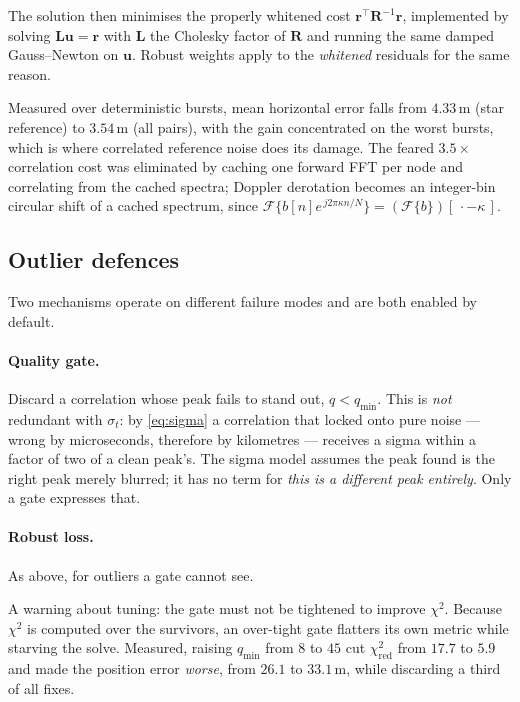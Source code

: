 \documentclass[11pt,a4paper]{article}
\begin{document}
The solution then minimises the properly whitened cost
$\mathbf{r}^\top\mathbf{R}^{-1}\mathbf{r}$, implemented by solving
$\mathbf{L}\mathbf{u}=\mathbf{r}$ with $\mathbf{L}$ the Cholesky factor of
$\mathbf{R}$ and running the same damped Gauss--Newton on $\mathbf{u}$.
Robust weights apply to the \emph{whitened} residuals for the same reason.

Measured over deterministic bursts, mean horizontal error falls from
$4.33$\,m (star reference) to $3.54$\,m (all pairs), with the gain
concentrated on the worst bursts, which is where correlated reference noise
does its damage. The feared $3.5\times$ correlation cost was eliminated by
caching one forward FFT per node and correlating from the cached spectra;
Doppler derotation becomes an integer-bin circular shift of a cached
spectrum, since
$\mathcal{F}\{b[n]e^{\,j2\pi \kappa n/N}\} = (\mathcal{F}\{b\})[\,\cdot-\kappa\,]$.

\subsection{Outlier defences}

Two mechanisms operate on different failure modes and are both enabled by
default.

\paragraph{Quality gate.} Discard a correlation whose peak fails to stand
out, $q<q_{\min}$. This is \emph{not} redundant with $\sigma_t$: by
\eqref{eq:sigma} a correlation that locked onto pure noise --- wrong by
microseconds, therefore by kilometres --- receives a sigma within a factor
of two of a clean peak's. The sigma model assumes the peak found is the
right peak merely blurred; it has no term for \emph{this is a different peak
entirely}. Only a gate expresses that.

\paragraph{Robust loss.} As above, for outliers a gate cannot see.

A warning about tuning: the gate must not be tightened to improve
$\chi^2$. Because $\chi^2$ is computed over the survivors, an over-tight
gate flatters its own metric while starving the solve. Measured, raising
$q_{\min}$ from $8$ to $45$ cut $\chi^2_{\text{red}}$ from $17.7$ to $5.9$
and made the position error \emph{worse}, from $26.1$ to $33.1$\,m, while
discarding a third of all fixes.
\end{document}
